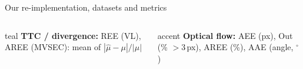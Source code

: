 \documentclass[aspectratio=169,10pt]{beamer}
\begin{document}
\begin{frame}{Our re-implementation, datasets and metrics}
  \vspace{0.5mm}
  \begin{columns}[T,onlytextwidth]
    \begin{card}[equal height group=met,fontupper=\footnotesize\raggedright,top=2pt,bottom=2pt]{teal}
      \textbf{TTC / divergence:} REE (VL), AREE (MVSEC): mean of $|\hat\mu-\mu|/|\mu|$
    \end{card}
    \begin{card}[equal height group=met,fontupper=\footnotesize\raggedright,top=2pt,bottom=2pt]{accent}
      \textbf{Optical flow:} AEE (px), Out (\% $>$3\,px), AREE (\%), AAE (angle, $^\circ$)
    \end{card}
  \end{columns}
\end{frame}
\end{document}
